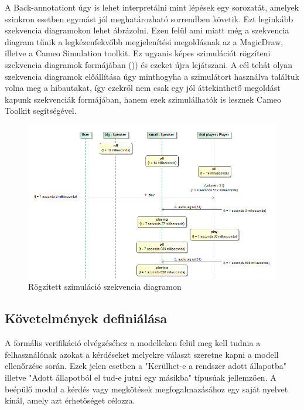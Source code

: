 A Back-annotationt úgy is lehet interpretálni mint lépések egy sorozatát, amelyek szinkron esetben egymást jól meghatározható sorrendben követik. Ezt leginkább szekvencia diagramokon lehet ábrázolni. Ezen felül ami miatt még a szekvencia diagram tűnik a legkézenfekvőbb megjelenítési megoldásnak az a MagicDraw, illetve a Cameo Simulation toolkit. Ez ugyanis képes szimulációt rögzíteni szekvencia diagramok formájában ()) és ezeket újra lejátszani. A cél tehát olyan szekvencia diagramok előállítása úgy minthogyha a szimulátort használva találtuk volna meg a hibautakat, így ezekről nem csak egy jól áttekinthető megoldást kapunk szekvenciák formájában, hanem ezek szimulálhatók is lesznek Cameo Toolkit segítségével.

\begin{figure}[!ht]
	\centering
	\includegraphics[width=140mm, keepaspectratio]{figures/contribution/md-cameo-rec.png}
	\caption[]{Rögzített szimuláció szekvencia diagramon\footnotemark}
	\label{fig:md-cameo-rec}
\end{figure}


\subsection{Követelmények definiálása}

A formális verifikáció elvégzéséhez a modelleken felül meg kell tudnia a felhasználónak azokat a kérdéseket melyekre választ szeretne kapni a modell ellenőrzése során. Ezek jelen esetben a "Kerülhet-e a rendszer adott állapotba" illetve "Adott állapotból el tud-e jutni egy másikba" típusúak jellemzően. A beépülő modul a kérdés vagy megkötések megfogalmazásához egy saját nyelvet kínál, amely azt érhetőséget célozza.


